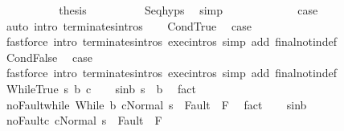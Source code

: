 \begin{isabellebody}
\ \ \ \ \ \ \isamarkupfalse%
\ {\isacharasterisk}\ \isamarkupfalse%
\ {\isacharquery}thesis\isanewline
\ \ \ \ \ \ \ \ \isamarkupfalse%
\ Seq{\isachardot}hyps\ \isamarkupfalse%
\ simp\isanewline
\ \ \ \ \isamarkupfalse%
\isanewline
\ \ \isacommand{{\isacharbraceright}}\isamarkupfalse%
\isanewline
\ \ \isamarkupfalse%
\ \isamarkupfalse%
\ {\isacharquery}case\isanewline
\ \ \ \ \isamarkupfalse%
\ {\isacharparenleft}auto\ intro{\isacharcolon}\ terminates{\isachardot}intros{\isacharparenright}\isanewline
{}\isamarkupfalse%
\isanewline
\ \ \isamarkupfalse%
\ CondTrue\ \isamarkupfalse%
\ {\isacharquery}case\isanewline
\ \ \ \ \isamarkupfalse%
\ {\isacharparenleft}fastforce\ intro{\isacharcolon}\ terminates{\isachardot}intros\ exec{\isachardot}intros\ simp\ add{\isacharcolon}\ final{\isacharunderscore}notin{\isacharunderscore}def\ {\isacharparenright}\ \isanewline
{}\isamarkupfalse%
\isanewline
\ \ \isamarkupfalse%
\ CondFalse\ \isamarkupfalse%
\ {\isacharquery}case\isanewline
\ \ \ \ \isamarkupfalse%
\ {\isacharparenleft}fastforce\ intro{\isacharcolon}\ terminates{\isachardot}intros\ exec{\isachardot}intros\ simp\ add{\isacharcolon}\ final{\isacharunderscore}notin{\isacharunderscore}def\ {\isacharparenright}\ \isanewline
{}\isamarkupfalse%
\isanewline
\ \ \isamarkupfalse%
\ {\isacharparenleft}WhileTrue\ s\ b\ c{\isacharparenright}\isanewline
\ \ \isamarkupfalse%
\ s{\isacharunderscore}in{\isacharunderscore}b{\isacharcolon}\ {\isachardoublequoteopen}s\ {\isasymin}\ b{\isachardoublequoteclose}\ \isamarkupfalse%
\ fact\isanewline
\ \ \isamarkupfalse%
\ noFault{\isacharunderscore}while{\isacharcolon}\ {\isachardoublequoteopen}{\isasymGamma}{\isasymturnstile}{\isasymlangle}While\ b\ c{\isacharcomma}Normal\ s\ {\isasymrangle}\ {\isasymRightarrow}{\isasymnotin}Fault\ {\isacharbackquote}\ F{\isachardoublequoteclose}\ \isamarkupfalse%
\ fact\isanewline
\ \ \isamarkupfalse%
\ s{\isacharunderscore}in{\isacharunderscore}b\ \isamarkupfalse%
\ noFault{\isacharunderscore}c{\isacharcolon}\ {\isachardoublequoteopen}{\isasymGamma}{\isasymturnstile}{\isasymlangle}c{\isacharcomma}Normal\ s\ {\isasymrangle}\ {\isasymRightarrow}{\isasymnotin}Fault\ {\isacharbackquote}\ F{\isachardoublequoteclose}\isanewline

\end{isabellebody}
